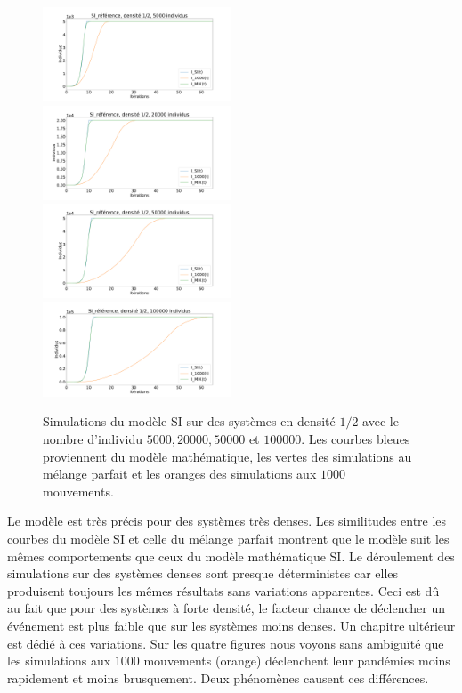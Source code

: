 \begin{figure}
	\centering
	\captionsetup{justification=centering}
	\includegraphics[width=0.5\textwidth]{Images/SI_ref_2_5k.pdf}
	\includegraphics[width=0.5\textwidth]{Images/SI_ref_2_20k.pdf}
	\includegraphics[width=0.5\textwidth]{Images/SI_ref_2_50k.pdf}
	\includegraphics[width=0.5\textwidth]{Images/SI_ref_2_100k.pdf}
	\caption[Simulations de SI, densité 1/2]{Simulations du modèle SI sur des systèmes en densité $1/2$ avec le nombre d'individu $5000,20000,50000$ et $100000$. Les courbes bleues proviennent du modèle mathématique, les vertes des simulations au mélange parfait et les oranges des simulations aux $1000$ mouvements.}
\end{figure}

Le modèle est très précis pour des systèmes très denses. Les similitudes entre les courbes du modèle SI et celle du mélange parfait montrent que le modèle suit les mêmes comportements que ceux du modèle mathématique SI. Le déroulement des simulations sur des systèmes denses sont presque déterministes car elles produisent toujours les mêmes résultats sans variations apparentes. Ceci est dû au fait que pour des systèmes à forte densité, le facteur chance de déclencher un événement est plus faible que sur les systèmes moins denses. Un chapitre ultérieur est dédié à ces variations. Sur les quatre figures nous voyons sans ambiguïté que les simulations aux $1000$ mouvements (orange) déclenchent leur pandémies moins rapidement et moins brusquement. Deux phénomènes causent ces différences. \\

